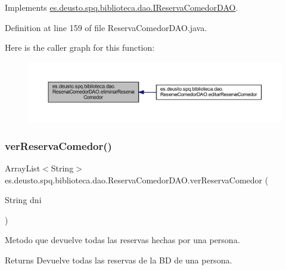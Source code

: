 Implements \mbox{\hyperlink{interfacees_1_1deusto_1_1spq_1_1biblioteca_1_1dao_1_1_i_reserva_comedor_d_a_o_ab135ff48fa3d6c4ea1c4bf78405b96f4}{es.\+deusto.\+spq.\+biblioteca.\+dao.\+I\+Reserva\+Comedor\+D\+AO}}.



Definition at line 159 of file Reserva\+Comedor\+D\+A\+O.\+java.

Here is the caller graph for this function\+:
\nopagebreak
\begin{figure}[H]
\begin{center}
\leavevmode
\includegraphics[width=350pt]{classes_1_1deusto_1_1spq_1_1biblioteca_1_1dao_1_1_reserva_comedor_d_a_o_afb0004fc47c5ea34a1187d1f6433892f_icgraph}
\end{center}
\end{figure}
\mbox{\label{classes_1_1deusto_1_1spq_1_1biblioteca_1_1dao_1_1_reserva_comedor_d_a_o_a4cac22c7d393f3994118317472f9ab95}} 
\subsubsection{\texorpdfstring{ver\+Reserva\+Comedor()}{verReservaComedor()}}
{\footnotesize\ttfamily Array\+List$<$String$>$ es.\+deusto.\+spq.\+biblioteca.\+dao.\+Reserva\+Comedor\+D\+A\+O.\+ver\+Reserva\+Comedor (\begin{DoxyParamCaption}\item[{String}]{dni }\end{DoxyParamCaption})}

Metodo que devuelve todas las reservas hechas por una persona. \begin{DoxyReturn}{Returns}
Devuelve todas las reservas de la BD de una persona. 
\end{DoxyReturn}


